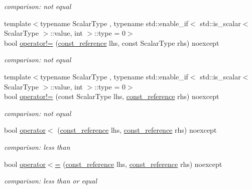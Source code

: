 \begin{DoxyCompactItemize}
\begin{DoxyCompactList}\small\item\em comparison\+: not equal \end{DoxyCompactList}\item 
{\footnotesize template$<$typename Scalar\+Type , typename std\+::enable\+\_\+if$<$ std\+::is\+\_\+scalar$<$ Scalar\+Type $>$\+::value, int $>$\+::type  = 0$>$ }\\bool \mbox{\hyperlink{classnlohmann_1_1basic__json_afefc38fc08bdb7a9a7474b5ab4a1140f}{operator!=}} (\mbox{\hyperlink{classnlohmann_1_1basic__json_a4057c5425f4faacfe39a8046871786ca}{const\+\_\+reference}} lhs, const Scalar\+Type rhs) noexcept
\begin{DoxyCompactList}\small\item\em comparison\+: not equal \end{DoxyCompactList}\item 
{\footnotesize template$<$typename Scalar\+Type , typename std\+::enable\+\_\+if$<$ std\+::is\+\_\+scalar$<$ Scalar\+Type $>$\+::value, int $>$\+::type  = 0$>$ }\\bool \mbox{\hyperlink{classnlohmann_1_1basic__json_ab0e886db6e9fa91ff9fd853333fed05b}{operator!=}} (const Scalar\+Type lhs, \mbox{\hyperlink{classnlohmann_1_1basic__json_a4057c5425f4faacfe39a8046871786ca}{const\+\_\+reference}} rhs) noexcept
\begin{DoxyCompactList}\small\item\em comparison\+: not equal \end{DoxyCompactList}\item 
bool \mbox{\hyperlink{classnlohmann_1_1basic__json_aacd442b66140c764c594ac8ad7dfd5b3}{operator$<$}} (\mbox{\hyperlink{classnlohmann_1_1basic__json_a4057c5425f4faacfe39a8046871786ca}{const\+\_\+reference}} lhs, \mbox{\hyperlink{classnlohmann_1_1basic__json_a4057c5425f4faacfe39a8046871786ca}{const\+\_\+reference}} rhs) noexcept
\begin{DoxyCompactList}\small\item\em comparison\+: less than \end{DoxyCompactList}\item 
bool \mbox{\hyperlink{classnlohmann_1_1basic__json_a5c8bb5200f5eac10d31e26be46e5b1ac}{operator$<$=}} (\mbox{\hyperlink{classnlohmann_1_1basic__json_a4057c5425f4faacfe39a8046871786ca}{const\+\_\+reference}} lhs, \mbox{\hyperlink{classnlohmann_1_1basic__json_a4057c5425f4faacfe39a8046871786ca}{const\+\_\+reference}} rhs) noexcept
\begin{DoxyCompactList}\small\item\em comparison\+: less than or equal \end{DoxyCompactList}\item 

\end{DoxyCompactItemize}
